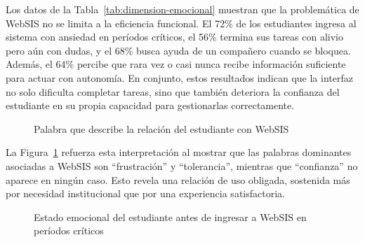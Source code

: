 Los datos de la Tabla~\ref{tab:dimension-emocional} muestran que la problemática de WebSIS no se limita a la eficiencia funcional. El 72\% de los estudiantes ingresa al sistema con ansiedad en períodos críticos, el 56\% termina sus tareas con alivio pero aún con dudas, y el 68\% busca ayuda de un compañero cuando se bloquea. Además, el 64\% percibe que rara vez o casi nunca recibe información suficiente para actuar con autonomía. En conjunto, estos resultados indican que la interfaz no solo dificulta completar tareas, sino que también deteriora la confianza del estudiante en su propia capacidad para gestionarlas correctamente.
 
\begin{figure}[h]
\centering
{}
\caption{Palabra que describe la relación del estudiante con WebSIS}
\label{fig:relacion-emocional}
\end{figure}

La Figura~\ref{fig:relacion-emocional} refuerza esta interpretación al mostrar que las palabras dominantes asociadas a WebSIS son ``frustración'' y ``tolerancia'', mientras que ``confianza'' no aparece en ningún caso. Esto revela una relación de uso obligada, sostenida más por necesidad institucional que por una experiencia satisfactoria.
 
\begin{figure}[h!]
\centering
{}
\caption{Estado emocional del estudiante antes de ingresar a WebSIS en períodos críticos}
\label{fig:ansiedad-previa}
\end{figure}

